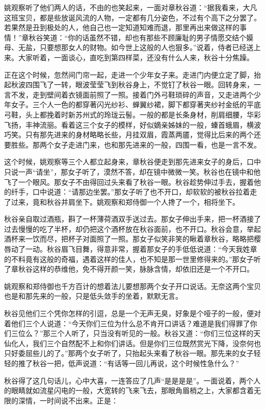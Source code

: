 \documentclass[12pt,UTF8]{ctexbook}
\begin{document}
{{{姚观察听了他们两人的话，不由的也笑起来，一面对章秋谷道：“据我看来，大凡这班宝贝，都是些放诞风流的人物，一定都有几分姿色，不过有个高下之分罢了。若果然是丑到极处的人，他自己也一定知道知难而退，那里再出来做这样的事情！”章秋谷笑道：“你的话虽然不错，却也有那些不顾廉耻的男子情愿交结个嫫母、无盐，只要想那女人的财物。如今世上这般的人也狠多。”说着，侍者已经送上来。大家听着，一面谈心，直吃到第四样菜，还没有什么人来，秋谷十分焦躁。

正在这个时候，忽然间门帘一起，走进一个少年女子来。走进门内便立定了脚，抬起秋波四围飞了一转，眼波莹莹飞到秋谷身上，不觉钉了秋谷一眼。回转身来，一言不发，走到壁间着衣镜面前照了一照。接着门外弓鞋琐碎的声音，又走进两个少年女子。三个人一色的都穿著闪光纱衫、蝉翼纱裙，脚下都穿著夹纱衬金纸的平底弓鞋，头上都挽着时新苏州式的玲珑云髻。一般的都是长条身材，削肩细腰，华彩飞扬，丰神流丽。看着这三个女子的模样，好似嫡亲姊妹的一般，螓首蛾眉，横波巧笑。只有那先进来的身材略略长些，月挂双眉，霞蒸两靥，觉得比后来的两个还要胜些。那两个女子走进门来，也和那先进来的一般，四围一看，也是一言不发。

这个时候，姚观察等三个人都立起身来，章秋谷便走到那先进来女子的身后，口中只说一声“请坐”，那女子听了，漠然不答，却在镜中微微一笑。秋谷也在镜中和他飞了一个眼风。那女子不由得回过头来看了秋谷一眼。秋谷趁势伸过手去，握着他的纤手，口中说道：“请那边坐罢。”那女子听了也不开口，却软软的被秋谷拉着走了过来，竟和秋谷并肩坐下。姚观察和郑侍御一个人搀了一个，相将坐下。

秋谷亲自取过酒瓶，斟了一杯薄荷酒双手送过去。那女子伸出手来，把一杯酒接了过去慢慢的吃了半杯，却仍把这个酒杯放在秋谷面前，也不开口。秋谷会意，举起酒杯来一饮而尽，把杯子对面照了一照。那女子似笑非笑的瞅着章秋谷，略略把樱唇动了一动。秋谷眉飞目舞，得意非常，握着那女子的手低低说道：“今天我姓章的不料竟有这般的奇福，遇着这样的佳人，也不知是那一世里修得来的。”那女子听了章秋谷这样的恭维他，免不得开颜一笑，脉脉含情，却依旧还是一个不开口。

姚观察和郑侍御也千方百计的想着法儿要想那两个女子开口说话。无奈这两个宝贝也是和那先来的一般，只是低头敛手的坐着，默默无言。

秋谷见他们三个凭你怎样的引逗，总是一个无声无臭，好象是个哑子的一般，便对着他们三个人说道：“今天你们三位为什么总不肯开口讲话？难道是我们得罪了你们三位么？”那三个人听了，只当没有听见的一般。秋谷又道：“你们三位这样的天仙化人，我们三个自然配不上和你们讲话。但是你们三位既然赏光下降，没奈何也只好委屈些儿的了。”那两个女子听了，只抬起头来看了秋谷一眼。那先来的女子轻轻的推了秋谷一把，低声说道：“有话等一回儿再说，这个时候性急什么？”

秋谷得了这几句话儿，心中大喜，一连答应了几声“是是是是”。一面说着，两个人的眼睛就如流星闪电的一般，大宽转的飞来飞去，那眼角眉梢之上，大家都含着无限的深情，一时间说不出来。正是：

}}}
\end{document}
